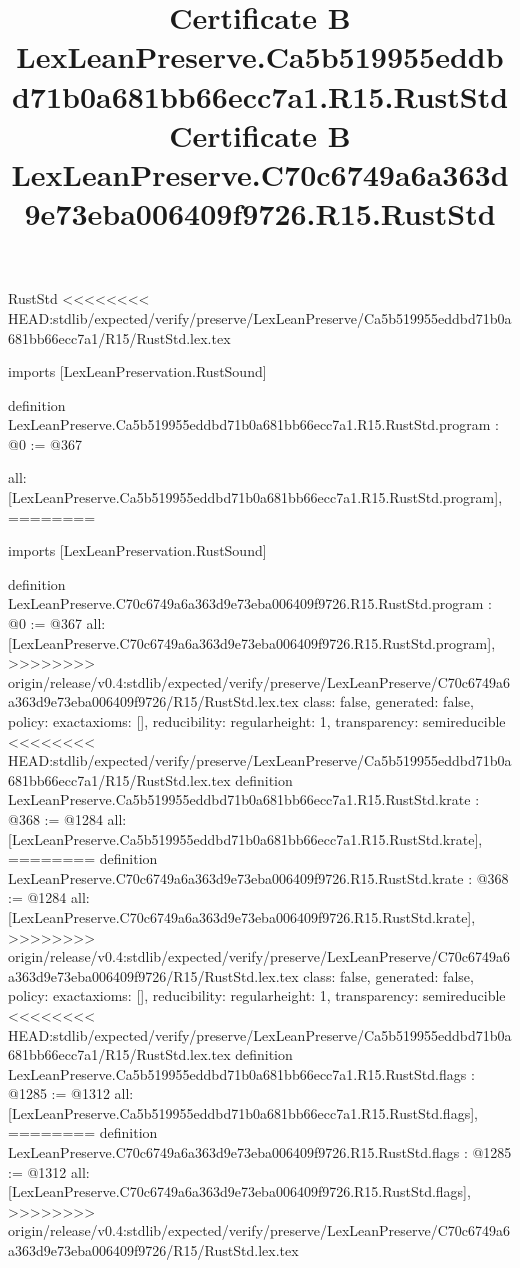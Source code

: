 \begin{lexlean}{RustStd}
<<<<<<<< HEAD:stdlib/expected/verify/preserve/LexLeanPreserve/Ca5b519955eddbd71b0a681bb66ecc7a1/R15/RustStd.lex.tex
\title{Certificate B LexLeanPreserve.Ca5b519955eddbd71b0a681bb66ecc7a1.R15.RustStd}
\begin{coremodule}
imports [LexLeanPreservation.RustSound]

definition LexLeanPreserve.Ca5b519955eddbd71b0a681bb66ecc7a1.R15.RustStd.program : @0 := @367 {
  all: [LexLeanPreserve.Ca5b519955eddbd71b0a681bb66ecc7a1.R15.RustStd.program],
========
\title{Certificate B LexLeanPreserve.C70c6749a6a363d9e73eba006409f9726.R15.RustStd}
\begin{coremodule}
imports [LexLeanPreservation.RustSound]

definition LexLeanPreserve.C70c6749a6a363d9e73eba006409f9726.R15.RustStd.program : @0 := @367 {
  all: [LexLeanPreserve.C70c6749a6a363d9e73eba006409f9726.R15.RustStd.program],
>>>>>>>> origin/release/v0.4:stdlib/expected/verify/preserve/LexLeanPreserve/C70c6749a6a363d9e73eba006409f9726/R15/RustStd.lex.tex
  class: false,
  generated: false,
  policy: exact{axioms: []},
  reducibility: regular{height: 1},
  transparency: semireducible
}
<<<<<<<< HEAD:stdlib/expected/verify/preserve/LexLeanPreserve/Ca5b519955eddbd71b0a681bb66ecc7a1/R15/RustStd.lex.tex
definition LexLeanPreserve.Ca5b519955eddbd71b0a681bb66ecc7a1.R15.RustStd.krate : @368 := @1284 {
  all: [LexLeanPreserve.Ca5b519955eddbd71b0a681bb66ecc7a1.R15.RustStd.krate],
========
definition LexLeanPreserve.C70c6749a6a363d9e73eba006409f9726.R15.RustStd.krate : @368 := @1284 {
  all: [LexLeanPreserve.C70c6749a6a363d9e73eba006409f9726.R15.RustStd.krate],
>>>>>>>> origin/release/v0.4:stdlib/expected/verify/preserve/LexLeanPreserve/C70c6749a6a363d9e73eba006409f9726/R15/RustStd.lex.tex
  class: false,
  generated: false,
  policy: exact{axioms: []},
  reducibility: regular{height: 1},
  transparency: semireducible
}
<<<<<<<< HEAD:stdlib/expected/verify/preserve/LexLeanPreserve/Ca5b519955eddbd71b0a681bb66ecc7a1/R15/RustStd.lex.tex
definition LexLeanPreserve.Ca5b519955eddbd71b0a681bb66ecc7a1.R15.RustStd.flags : @1285 := @1312 {
  all: [LexLeanPreserve.Ca5b519955eddbd71b0a681bb66ecc7a1.R15.RustStd.flags],
========
definition LexLeanPreserve.C70c6749a6a363d9e73eba006409f9726.R15.RustStd.flags : @1285 := @1312 {
  all: [LexLeanPreserve.C70c6749a6a363d9e73eba006409f9726.R15.RustStd.flags],
>>>>>>>> origin/release/v0.4:stdlib/expected/verify/preserve/LexLeanPreserve/C70c6749a6a363d9e73eba006409f9726/R15/RustStd.lex.tex
}}}
\end{coremodule}}
\end{coremodule}
\end{lexlean}

